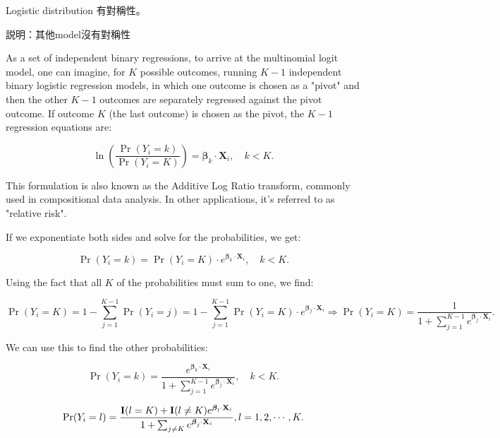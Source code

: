 \documentclass[UTF8,a4paper,10pt]{article}
\begin{document}
\pagebreak

\begin{Problem}[]{}
  Logistic distribution 有對稱性。

  説明：其他model沒有對稱性
\end{Problem}

As a set of independent binary regressions, to arrive at the multinomial logit model, one can imagine, for $K$ possible outcomes, running $K-1$ independent binary logistic regression models, in which one outcome is chosen as a "pivot" and then the other $K-1$ outcomes are separately regressed against the pivot outcome. If outcome $K$ (the last outcome) is chosen as the pivot, the $K-1$ regression equations are:

\begin{equation}
\ln\left(\frac{\Pr(Y_i=k)}{\Pr(Y_i=K)}\right) = \boldsymbol{\beta}_k \cdot \mathbf{X}_i, \quad k < K.
\end{equation}

This formulation is also known as the Additive Log Ratio transform, commonly used in compositional data analysis. In other applications, it's referred to as "relative risk".

If we exponentiate both sides and solve for the probabilities, we get:

\begin{equation}
\Pr(Y_i=k) = \Pr(Y_i=K) \cdot e^{\boldsymbol{\beta}_k \cdot \mathbf{X}_i}, \quad k < K.
\end{equation}

Using the fact that all $K$ of the probabilities must sum to one, we find:

\begin{equation}
\Pr(Y_i=K) = 1 - \sum_{j=1}^{K-1} \Pr(Y_i=j) = 1 - \sum_{j=1}^{K-1} \Pr(Y_i=K) \cdot e^{\boldsymbol{\beta}_j \cdot \mathbf{X}_i} \Rightarrow \Pr(Y_i=K) = \frac{1}{1 + \sum_{j=1}^{K-1} e^{\boldsymbol{\beta}_j \cdot \mathbf{X}_i}}.
\end{equation}

We can use this to find the other probabilities:

\begin{equation}
\Pr(Y_i=k) = \frac{e^{\boldsymbol{\beta}_k \cdot \mathbf{X}_i}}{1 + \sum_{j=1}^{K-1} e^{\boldsymbol{\beta}_j \cdot \mathbf{X}_i}}, \quad k < K.
\end{equation}

\begin{equation}
  \Pr(Y_i=l) = \frac{\operatorname{\mathbf{I}}(l = K)+\operatorname{\mathbf{I}}(l\neq K)e^{\boldsymbol{\beta}_l \cdot \mathbf{X}_i}}{1 + \sum_{j\neq K} e^{\boldsymbol{\beta}_j \cdot \mathbf{X}_i}}, l = 1,2,\cdots,K.
  \end{equation}
\end{document}
